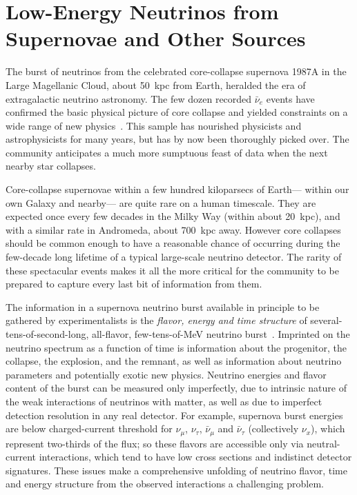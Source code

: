 
\section{Low-Energy Neutrinos from Supernovae and Other Sources}
\label{sec:landscape-snb}


The burst of neutrinos from the celebrated core-collapse supernova 1987A in the Large Magellanic Cloud, about
50~kpc from Earth, heralded the era of extragalactic neutrino
astronomy.  The few dozen recorded $\bar{\nu}_e$ events
have confirmed the basic physical
picture of core collapse and yielded constraints on a wide range of new
physics~\cite{Schramm:1990pf, Vissani:2014doa}.   This sample has nourished physicists and
astrophysicists for many years, but has
by now been thoroughly picked over.  The community anticipates a
much more sumptuous feast of data when the next nearby star collapses.

Core-collapse supernovae within a few hundred kiloparsecs of Earth---
within our own Galaxy and nearby--- are quite rare on a human
timescale.  They are expected once every few decades in the Milky Way
(within about 20~kpc), and with a similar rate in Andromeda, about
700~kpc away.  However core collapses should be common enough to have
a reasonable chance of occurring during the few-decade long lifetime
of a typical large-scale neutrino detector.  The rarity of these
spectacular events makes it all the more critical for the community to
be prepared to capture every last bit of information from them.

The information in a supernova neutrino burst available in principle
to be gathered by experimentalists is the \textit{flavor, energy and
  time structure} of several-tens-of-second-long, all-flavor,
few-tens-of-MeV neutrino burst~\cite{Mirizzi:2015eza, Horiuchi:2017sku}.  Imprinted on
the neutrino spectrum as a function of time is information about the
progenitor, the collapse, the explosion, and the remnant, as well as
information about neutrino parameters and potentially exotic new
physics.  Neutrino energies and flavor content of the burst can be
measured only imperfectly, due to intrinsic nature of the weak
interactions of neutrinos with matter, as well as due to imperfect
detection resolution in any real detector.  For example, supernova
burst energies are below charged-current threshold for $\nu_\mu$,
$\nu_\tau$, $\bar{\nu}_\mu$ and $\bar{\nu}_{\tau}$ (collectively
$\nu_x$), which represent two-thirds of the flux; so these flavors are
accessible only via neutral-current interactions, which tend to have
low cross sections and indistinct detector signatures. These issues make a
comprehensive unfolding of neutrino flavor, time and energy structure
from the observed interactions a challenging problem.

